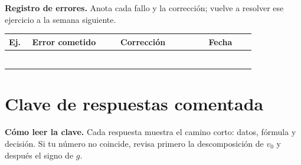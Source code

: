 \documentclass[12pt, letterpaper]{article}
\begin{document}
\noindent\textbf{Registro de errores.} Anota cada fallo y la corrección; vuelve
a resolver ese ejercicio a la semana siguiente.

\begin{center}
\small
\begin{tabular}{@{}p{0.07\linewidth}p{0.30\linewidth}p{0.30\linewidth}p{0.16\linewidth}@{}}
  \toprule
  \textbf{Ej.} & \textbf{Error cometido} & \textbf{Corrección} & \textbf{Fecha} \\
  \midrule
   & & & \\ \midrule
   & & & \\ \midrule
   & & & \\ \midrule
   & & & \\ \midrule
   & & & \\ \midrule
   & & & \\
  \bottomrule
\end{tabular}
\end{center}

\ifmwclaves
\clearpage
\section*{Clave de respuestas comentada}

\begin{cuadroinfo}
  \small
  \textbf{Cómo leer la clave.} Cada respuesta muestra el camino corto:
  datos, fórmula y decisión. Si tu número no coincide, revisa primero la
  descomposición de $v_0$ y después el signo de $g$.
\end{cuadroinfo}
\end{document}
